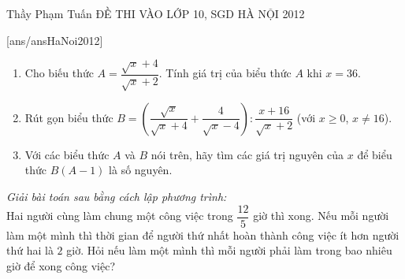 \begin{name}
{Thầy Phạm Tuấn }
{ĐỀ THI VÀO LỚP 10, SGD HÀ NỘI 2012}
\end{name}
[ans/ansHaNoi2012]
\begin{ex}%
\begin{enumerate}
\item Cho biếu thức $A=\dfrac{\sqrt{x}+4}{\sqrt{x}+2}$. Tính giá trị của biểu thức $A$ khi $x=36$.
\item Rút gọn biểu thức $B=\left(\dfrac{\sqrt{x}}{\sqrt{x}+4}+\dfrac{4}{\sqrt{x}-4}\right):\dfrac{x+16}{\sqrt{x}+2}$ (với $x\ge 0$, $x\not=16$).
\item Với các biểu thức $A$ và $B$ nói trên, hãy tìm các giá trị nguyên của $x$ để biểu thức $B(A-1)$ là số nguyên.
\end{enumerate}
\end{ex}
\begin{ex}%
\textit{Giải bài toán sau bằng cách lập phương trình:}\\
Hai người cùng làm chung một công việc trong $\dfrac{12}{5}$ giờ thì xong. Nếu mỗi người làm một mình thì thời gian để người thứ nhất hoàn thành công việc ít hơn người thứ hai là $2$ giờ. Hỏi nếu làm một mình thì mỗi người phải làm trong bao nhiêu giờ để xong công việc?
\end{ex}

